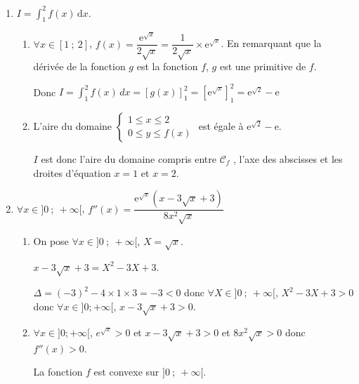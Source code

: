 \documentclass[10pt]{article}
\providecommand{\e}{{\mathrm{e}}}
\providecommand{\ds}{\displaystyle}
\begin{document}
\begin{enumerate}
\begin{enumerate}
\begin{center}
\end{center}
		\item La fonction $f$ est continue et strictement croissante sur l'intervalle $[1~;~+\infty[$ à valeurs dans $\left[\dfrac{\e}{2}~;~+\infty\right[$. Or $2\in \left[\dfrac{\e}{2}~;~+\infty\right[$ (car $\dfrac{\e}{2}<2$) donc d'après le corollaire du TVI, l'équation $f(x) = 2$ admet une unique solution notée $\alpha$ dans $[1;+\infty[$.

À la calculatrice : $\alpha\approx 4,6$.
	\end{enumerate}
	\item $I = \ds\int_1^2 f(x) \, \text{d}x$.
	\begin{enumerate}
		\item $\forall x \in [1~;~2]$, $f(x)=\dfrac{\e^{\sqrt{x}}}{2 \sqrt{x}}=\dfrac{1}{2\sqrt{x}} \times {\e^{\sqrt{x}}}$.
En remarquant que la dérivée de la fonction $g$ est la fonction $f$, $g$ est une primitive de $f$.

Donc $I = \ds\int_1^2 f(x) \, dx=\left[g(x)\right]_1^2=\left[\e^{\sqrt{x}}\right]_1^2= \e^{\sqrt{2}}- \e$
		\item L'aire du domaine $\begin{cases} 1\leqslant x \leqslant 2 \\ 0\leqslant y \leqslant f(x)\end{cases}$ est égale à $\e^{\sqrt{2}}- \e$.
		
$I$ est donc l'aire du domaine compris entre $\mathcal{C}_f$ , l'axe des abscisses et les droites d'équation $x =1$ et $x =2$.
	\end{enumerate}
	\item $\forall x \in ]0~;~ +\infty[$, $f''(x) = \dfrac{\e^{\sqrt{x}} (x - 3 \sqrt{x} + 3)}{8 x^2 \sqrt{x}}$
	\begin{enumerate}
		\item On pose $\forall x \in ]0~;~ +\infty[$, $X=\sqrt{x}$.

$x - 3 \sqrt{x} + 3=X^2-3X+3$.

		$\Delta=(-3)^2-4\times 1\times 3=-3<0$ donc $\forall X \in ]0~;~ +\infty[$, $X^2-3X+3>0$ donc $\forall x \in ]0; +\infty[$, $x - 3 \sqrt{x} + 3>0$.
		\item $\forall x \in ]0; +\infty[$, $e^{\sqrt{x}}>0$ et $x - 3 \sqrt{x} + 3>0$ et $8 x^2 \sqrt{x}>0$ donc $f''(x)>0$.
		
		La fonction $f$ est convexe sur $]0~;~ +\infty[$.
	\end{enumerate}
\end{enumerate}
\end{document}
